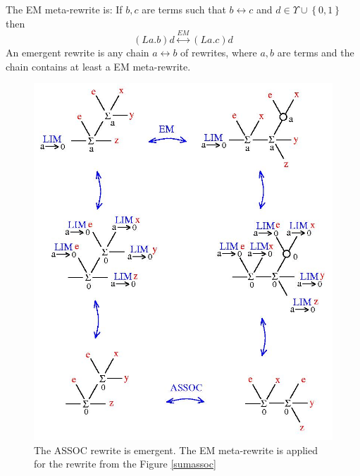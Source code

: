 \documentclass{article}
\begin{document}
\begin{definition}
The EM meta-rewrite is: If $b, c$ are terms such that $\displaystyle b \leftrightarrow c$  and $\displaystyle d \in \Upsilon \cup \left\{ 0 , 1 \right\}$ then 
$$\displaystyle (La.b) d \stackrel{EM}{\longleftrightarrow} (La.c) d$$
An emergent rewrite is any chain $a \longleftrightarrow b$ of rewrites, where $a, b$ are terms and the chain contains at least a EM meta-rewrite. 
\end{definition}



\begin{figure}[h]\centerline{\includegraphics[width=120mm]{jpg/sumassoc-em.jpg}}  \caption{ The ASSOC rewrite is emergent. The EM meta-rewrite is applied for the rewrite from the Figure \ref{sumassoc}} \label{sumassoc-em-fig} \end{figure}
\end{document}
